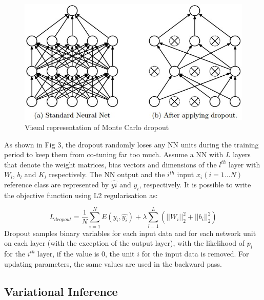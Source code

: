 \documentclass[journal]{IEEEtran}
\begin{document}
\begin{figure}[ht]
  \centering
  \includegraphics[scale=0.4]{figures/mc_dropout.JPG}
  \caption{Visual representation of Monte Carlo dropout}
\end{figure}

As shown in Fig 3, the dropout randomly loses any NN units during the training
period to keep them from co-tuning far too much.
Assume a NN with $L$ layers that denote the weight matrices, bias vectors and
dimensions of the $l^{th}$ layer with $W_l$, $b_l$ and $K_l$ respectively.
The NN output and the $i^{th}$ input $x_i(i = 1...N)$
reference class are represented by $\hat{y i}$ and $y_i$, respectively.
It is possible to write the
objective function using L2 regularisation as: 

\begin{equation*}
    L_{dropout} = \frac{1}{N}\sum_{i=1}^{N} E( y_i,\hat{y_i}) + \lambda \sum_{l=1}^{L} (||W_i||^2_2 + ||b_i||^2_2) 
\end{equation*}
Dropout samples binary variables for each input data and for each network unit on each layer (with the exception of the output layer),
with the likelihood of $p_i$ for the $i^{th}$ layer, if the value is 0, the unit $i$ for the input data is removed. For updating parameters, the same values
are used in the backward pass.

\subsection{Variational Inference}
\end{document}
